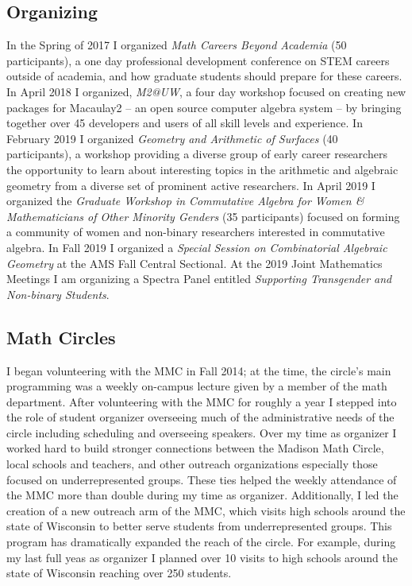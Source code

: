 \documentclass[10pt,reqno]{amsart}
\theoremstyle{remark}
\begin{document}
\subsection{Organizing}
In the Spring of 2017 I organized \textit{Math Careers Beyond Academia } (50 participants), a one day professional development conference on STEM careers outside of academia, and how graduate students should prepare for these careers. In April 2018 I organized, \textit{M2@UW}, a four day workshop focused on creating new packages for Macaulay2 -- an open source computer algebra system -- by bringing together over 45 developers and users of all skill levels and experience. In February 2019 I organized \textit{Geometry and Arithmetic of Surfaces} (40 participants), a workshop providing a diverse group of early career researchers the opportunity to learn about interesting topics in the arithmetic and algebraic geometry from a diverse set of prominent active researchers. In April 2019 I organized the \textit{Graduate Workshop in Commutative Algebra for Women \& Mathematicians of Other Minority Genders} (35 participants)  focused on forming a community of women and non-binary researchers interested in commutative algebra. In Fall 2019 I organized a \textit{Special Session on Combinatorial Algebraic Geometry} at the AMS Fall Central Sectional. At the 2019 Joint Mathematics Meetings I am organizing a Spectra Panel entitled \textit{Supporting Transgender and Non-binary Students}. 

\subsection{Math Circles}
I began volunteering with the MMC in Fall 2014; at the time, the circle's main programming was a weekly on-campus lecture given by a member of the math department. After volunteering with the MMC for roughly a year I stepped into the role of student organizer overseeing much of the administrative needs of the circle including scheduling and overseeing speakers. Over my time as organizer I worked hard to build stronger connections between the Madison Math Circle, local schools and teachers, and other outreach organizations especially those focused on underrepresented groups. These ties helped the weekly attendance of the MMC more than double during my time as organizer. Additionally, I led the creation of a new outreach arm of the MMC, which visits high schools around the state of Wisconsin to better serve students from underrepresented groups. This program has dramatically expanded the reach of the circle. For example, during my last full yeas as organizer I planned over 10 visits to high schools around the state of Wisconsin reaching over 250 students. 
\end{document}
